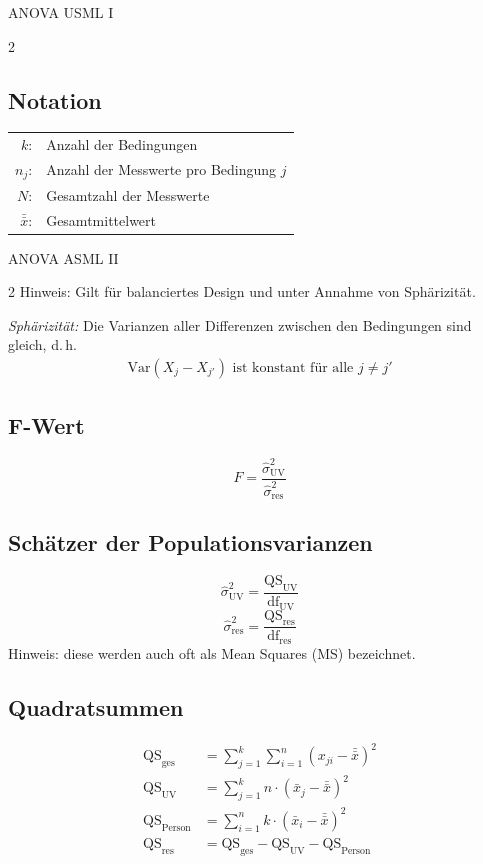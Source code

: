 \begin{formulaBox}{ANOVA US}{ML I}
\begin{multicols}{2}
\subsection*{Notation}

\begin{tabular}{rl}
$k$: &Anzahl der Bedingungen \\
$n_j$: &Anzahl der Messwerte pro Bedingung $j$ \\
$N$: &Gesamtzahl der Messwerte\\
$\bar{\bar{x}}$: & Gesamtmittelwert

\end{tabular}
\end{multicols}
\end{formulaBox}

\begin{formulaBox}{ANOVA AS}{ML II}
\begin{multicols}{2}
Hinweis: Gilt für balanciertes Design und unter Annahme von Sphärizität.

\textit{Sphärizität:} Die Varianzen aller Differenzen zwischen den Bedingungen sind gleich, d.\,h.
\begin{align*}
\mathrm{Var}(X_j - X_{j'}) \text{ ist konstant für alle } j \neq j'
\end{align*}
\subsection*{F-Wert}
$$F=\frac{\hat{\sigma}_{\mathrm{UV}}^2}{\hat{\sigma}_{\mathrm{res}}^2}$$

\subsection*{Schätzer der Populationsvarianzen}
$$\hat{\sigma}_{\mathrm{UV}}^2= \frac{\mathrm{QS}_{\mathrm{UV}}}{\mathrm{df}_{\mathrm{UV}}}$$
$$\hat{\sigma}_{\mathrm{res}}^2= \frac{\mathrm{QS}_{\mathrm{res}}}{\mathrm{df}_{\mathrm{res}}}$$
Hinweis: diese werden auch oft als Mean Squares (MS) bezeichnet.

\subsection*{Quadratsummen}
\begin{align*}
\mathrm{QS}_{\mathrm{ges}} &= \sum_{j=1}^k \sum_{i=1}^n (x_{ji}-\bar{\bar{x}})^2 \\
\mathrm{QS}_{\mathrm{UV}} &= \sum_{j=1}^k n\cdot (\bar{x}_{j}-\bar{\bar{x}})^2 \\
\mathrm{QS}_{\mathrm{Person}} &= \sum_{i=1}^n k\cdot (\bar{x}_{i}-\bar{\bar{x}})^2 \\
\mathrm{QS}_{\mathrm{res}} &= \mathrm{QS}_{\mathrm{ges}} - \mathrm{QS}_{\mathrm{UV}} - \mathrm{QS}_{\mathrm{Person}}
\end{align*}


\end{multicols}
\end{formulaBox}
